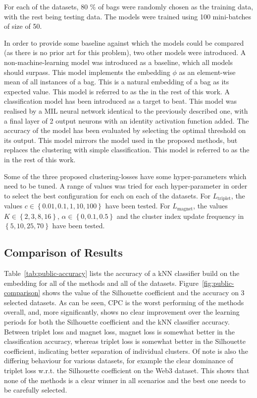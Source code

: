 For each of the datasets, 80 \% of bags were randomly chosen as the training data, with the rest being testing data. The models were trained using 100 mini-batches of size of 50.

In order to provide some baseline against which the models could be compared (as there is no prior art for this problem), two other models were introduced. A non-machine-learning model was introduced as a baseline, which all models should surpass. This model implements the embedding \( \phi \) as an element-wise mean of all instances of a bag. This is a natural embedding of a bag as its expected value. This model is referred to as the  in the rest of this work. A classification model has been introduced as a target to beat. This model was realised by a MIL neural network identical to the previously described one, with a final layer of 2 output neurons with an identity activation function added. The accuracy of the model has been evaluated by selecting the optimal threshold on its output. This model mirrors the model used in the proposed methods, but replaces the clustering with simple classification. This model is referred to as the  in the rest of this work.

Some of the three proposed clustering-losses have some hyper-parameters which need to be tuned. A range of values was tried for each hyper-parameter in order to select the best configuration for each on each of the datasets. For \( L_\mathrm{triplet} \), the values \( c \in \left\{ 0.01, 0.1, 1, 10, 100 \right\} \) have been tested. For \( L_\mathrm{magnet} \), the values \( K \in \left\{ 2, 3, 8, 16 \right\} \), \( \alpha \in \left\{ 0, 0.1, 0.5 \right\} \) and the cluster index update frequency in \( \left\{ 5, 10, 25, 70 \right\} \) have been tested.

\subsection{Comparison of Results}\label{sec:experiment-comparison}

Table~\ref{tab:public-accuracy} lists the accuracy of a kNN classifier build on the embedding for all of the methods and all of the datasets. Figure~\ref{fig:public-comparison} shows the value of the Silhouette coefficient and the accuracy on 3 selected datasets. As can be seen, CPC is the worst performing of the methods overall, and, more significantly, shows no clear improvement over the learning periods for both the Silhouette coefficient and the kNN classifier accuracy. Between triplet loss and magnet loss, magnet loss is somewhat better in the classification accuracy, whereas triplet loss is somewhat better in the Silhouette coefficient, indicating better separation of individual clusters. Of note is also the differing behaviour for various datasets, for example the clear dominance of triplet loss w.r.t. the Silhouette coefficient on the Web3 dataset. This shows that none of the methods is a clear winner in all scenarios and the best one needs to be carefully selected.

